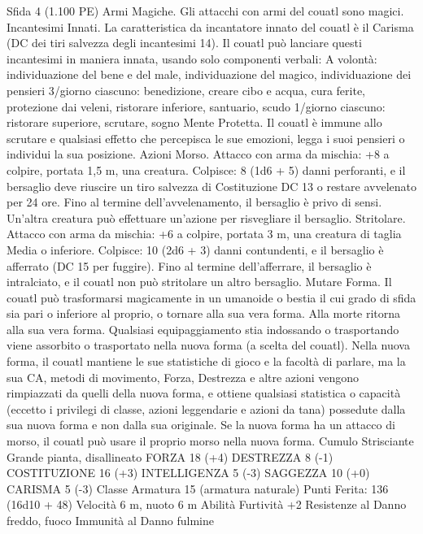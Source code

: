 \begin{multicols}{2}
Sfida 4 (1.100 PE)
Armi Magiche. Gli attacchi con armi del couatl sono magici.
Incantesimi Innati. La caratteristica da incantatore innato del
couatl è il Carisma (DC dei tiri salvezza degli incantesimi 14). Il
couatl può lanciare questi incantesimi in maniera innata, usando
solo componenti verbali:
A volontà: individuazione del bene e del male, individuazione del
magico, individuazione dei pensieri
3/giorno ciascuno: benedizione, creare cibo e acqua, cura ferite,
protezione dai veleni, ristorare inferiore, santuario, scudo
1/giorno ciascuno: ristorare superiore, scrutare, sogno
Mente Protetta. Il couatl è immune allo scrutare e qualsiasi
effetto che percepisca le sue emozioni, legga i suoi pensieri o
individui la sua posizione.
Azioni
Morso. Attacco con arma da mischia: +8 a colpire, portata 1,5
m, una creatura.
Colpisce: 8 (1d6 + 5) danni perforanti, e il bersaglio deve
riuscire un tiro salvezza di Costituzione DC 13 o restare
avvelenato per 24 ore. Fino al termine dell’avvelenamento, il
bersaglio è privo di sensi. Un’altra creatura può effettuare
un’azione per risvegliare il bersaglio.
Stritolare. Attacco con arma da mischia: +6 a colpire, portata 3
m, una creatura di taglia Media o inferiore.
Colpisce: 10 (2d6 + 3) danni contundenti, e il bersaglio è afferrato
(DC 15 per fuggire). Fino al termine dell’afferrare, il bersaglio è
intralciato, e il couatl non può stritolare un altro bersaglio.
Mutare Forma. Il couatl può trasformarsi magicamente in un
umanoide o bestia il cui grado di sfida sia pari o inferiore al proprio,
o tornare alla sua vera forma. Alla morte ritorna alla sua vera forma.
Qualsiasi equipaggiamento stia indossando o trasportando viene
assorbito o trasportato nella nuova forma (a scelta del couatl).
Nella nuova forma, il couatl mantiene le sue statistiche di gioco e la
facoltà di parlare, ma la sua CA, metodi di movimento, Forza,
Destrezza e altre azioni vengono rimpiazzati da quelli della nuova
forma, e ottiene qualsiasi statistica o capacità (eccetto i privilegi di
classe, azioni leggendarie e azioni da tana) possedute dalla sua nuova
forma e non dalla sua originale. Se la nuova forma ha un attacco di
morso, il couatl può usare il proprio morso nella nuova forma.
Cumulo Strisciante
Grande pianta, disallineato
FORZA 18 (+4)
DESTREZZA 8 (-1)
COSTITUZIONE 16 (+3)
INTELLIGENZA 5 (-3)
SAGGEZZA 10 (+0)
CARISMA 5 (-3)
Classe Armatura 15 (armatura naturale)
\hspace*{0pt}\hfill{Punti Ferita}: 136 (16d10 + 48)
Velocità 6 m, nuoto 6 m
Abilità Furtività +2
Resistenze al Danno freddo, fuoco
Immunità al Danno fulmine

\end{multicols}
